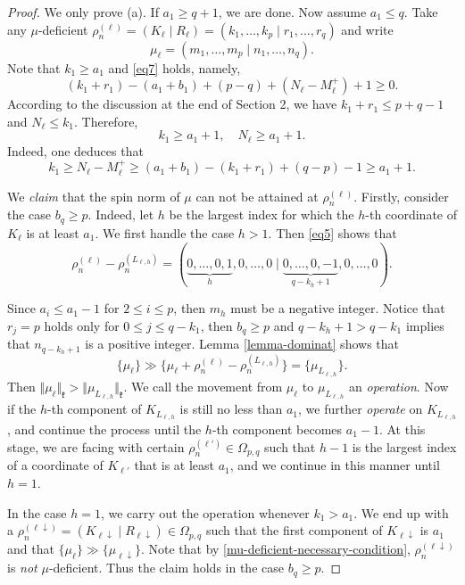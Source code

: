 \documentclass[11pt]{amsart}
\theoremstyle{plain}
\theoremstyle{definition}
\newcommand{\frk}{\mathfrak{k}}
\begin{document}
\begin{proof}
	We only prove (a). If $a_1\ge q+1$, we are done. Now assume $a_1\le q$. Take any $\mu$-deficient $\rho_n^{(\ell)}=(K_\ell\mid R_\ell)=(k_1,\dots,k_p\mid r_1,\dots,r_q)$ and write
	\[\mu_\ell=(m_1, \dots, m_p\mid n_1, \dots, n_q).\]
Note that $k_1\ge a_1$ and \eqref{eq7} holds, namely,
	\[(k_1+r_1)-(a_1+b_1)+(p-q)+(N_\ell-M_\ell^+)+1\ge 0.\]
	According to the discussion at the end of Section 2, we have $k_1+r_1\le p+q-1$ and $N_{\ell}\leq k_1$. Therefore,
\begin{equation}\label{mu-deficient-necessary-condition}
k_1 \ge a_1+1, \quad N_{\ell} \ge a_1+1.
\end{equation}
Indeed, one deduces that
\[k_1\ge N_\ell-M_\ell^+\ge (a_1+b_1)-(k_1+r_1)+(q-p)-1\ge a_1+1.\]

We \emph{claim} that the spin norm of $\mu$ can not be attained at $\rho_n^{(\ell)}$. Firstly, consider the case $b_q\ge p$.
Indeed, let $h$ be the largest index for which the $h$-th coordinate of $K_\ell$ is at least $a_1$. We first handle the case $h>1$. Then \eqref{eq5} shows that
	\begin{equation}\label{eq-rhoL}
	\rho_n^{(\ell)}-\rho_n^{(L_{\ell, h})}=(\underbrace{0,\dots,0,1}_h,0,\dots,0\mid \underbrace{0,\dots,0,-1}_{q-k_h+1},0,\dots,0).
	\end{equation}
	
	Since $a_i\le a_1-1$ for $2\leq i\leq p$, then $m_h$ must be a negative integer. Notice that $r_j=p$ holds only for $0\le j\le q-k_1$, then $b_q\ge p$ and $q-k_h+1>q-k_1$ implies that $n_{q-k_h+1}$ is a positive integer. Lemma \ref{lemma-dominat} shows that
$$
\{\mu_\ell\}\gg\{\mu_\ell+\rho_n^{(\ell)}-\rho_n^{(L_{\ell, h})}\}=\{\mu_{L_{\ell, h}}\}.
$$
Then $\Vert\mu_\ell\Vert_\frk>\Vert \mu_{L_{\ell, h}}\Vert_\frk$. We call the movement from $\mu_\ell$ to $\mu_{L_{\ell, h}}$ an \emph{operation}.
Now if the $h$-th component of $K_{L_{\ell, h}}$ is still no less than $a_1$, we further \emph{operate} on $K_{L_{\ell, h}}$, and continue the process until the $h$-th component becomes $a_1-1$. At this stage, we are facing with certain $\rho_n^{(\ell')}\in \Omega_{p, q}$ such that  $h-1$ is the largest index of a coordinate of $K_{\ell'}$ that is at least $a_1$, and we continue in this manner until $h=1$.

In the case $h=1$, we carry out the operation whenever $k_1>a_1$. We end up with a $\rho_n^{(\ell\downarrow)}=(K_{\ell\downarrow}\mid R_{\ell\downarrow})\in \Omega_{p, q}$ such that the first component of $K_{\ell\downarrow}$ is $a_1$ and that $\{\mu_\ell\}\gg\{\mu_{\ell\downarrow}\}$.
Note that by \eqref{mu-deficient-necessary-condition}, $\rho_n^{(\ell\downarrow)}$ is \emph{not} $\mu$-deficient.
Thus the claim holds in the case $b_q\ge p$.
	

\end{proof}
\end{document}
